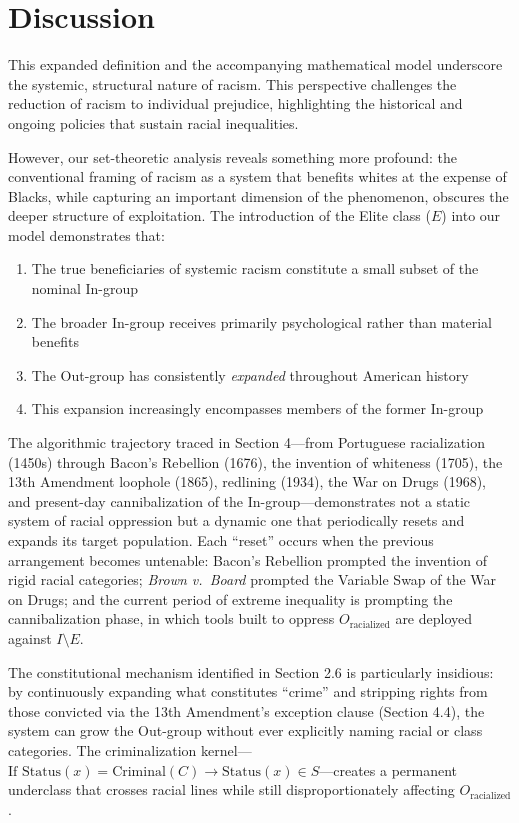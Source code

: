 \documentclass[12pt]{article}
\begin{document}
\section{Discussion}

This expanded definition and the accompanying mathematical model underscore the systemic, structural nature of racism. This perspective challenges the reduction of racism to individual prejudice, highlighting the historical and ongoing policies that sustain racial inequalities.

However, our set-theoretic analysis reveals something more profound: the conventional framing of racism as a system that benefits whites at the expense of Blacks, while capturing an important dimension of the phenomenon, obscures the deeper structure of exploitation. The introduction of the Elite class ($E$) into our model demonstrates that:

\begin{enumerate}
    \item The true beneficiaries of systemic racism constitute a small subset of the nominal In-group
    \item The broader In-group receives primarily psychological rather than material benefits
    \item The Out-group has consistently \textit{expanded} throughout American history
    \item This expansion increasingly encompasses members of the former In-group
\end{enumerate}

The algorithmic trajectory traced in Section 4---from Portuguese racialization (1450s) through Bacon's Rebellion (1676), the invention of whiteness (1705), the 13th Amendment loophole (1865), redlining (1934), the War on Drugs (1968), and present-day cannibalization of the In-group---demonstrates not a static system of racial oppression but a dynamic one that periodically resets and expands its target population. Each ``reset'' occurs when the previous arrangement becomes untenable: Bacon's Rebellion prompted the invention of rigid racial categories; \textit{Brown v.\ Board} prompted the Variable Swap of the War on Drugs; and the current period of extreme inequality is prompting the cannibalization phase, in which tools built to oppress $O_{\text{racialized}}$ are deployed against $I \setminus E$.

The constitutional mechanism identified in Section 2.6 is particularly insidious: by continuously expanding what constitutes ``crime'' and stripping rights from those convicted via the 13th Amendment's exception clause (Section 4.4), the system can grow the Out-group without ever explicitly naming racial or class categories. The criminalization kernel---$\text{If } \text{Status}(x) = \text{Criminal}(C) \rightarrow \text{Status}(x) \in S$---creates a permanent underclass that crosses racial lines while still disproportionately affecting $O_{\text{racialized}}$.
\end{document}
